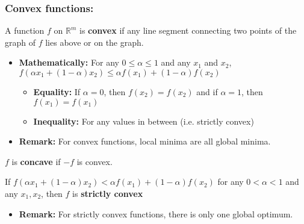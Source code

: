     \subsubsection{Convex functions:}
    \begin{definition}
        A function $f$ on $\mathbb{R}^m$ is \textbf{convex} if any line segment connecting two points of the graph of $f$ lies above or on the graph. 

            \begin{itemize}
                \item \textbf{Mathematically:} For any \( 0 \leq \alpha \leq 1 \) and any \( x_1 \) and \( x_2 \), $f(\alpha x_1 + (1-\alpha) x_2) \leq \alpha f(x_1) + (1-\alpha) f(x_2)$ 
                \begin{itemize}
                    \item \textbf{Equality:} If $\alpha = 0$, then $f(x_2) = f(x_2)$ and if $\alpha = 1$, then $f(x_1) = f(x_1)$
                    \item \textbf{Inequality:} For any values in between (i.e. strictly convex)
                \end{itemize}
                \item \textbf{Remark:} For convex functions, local minima are all global minima.
            \end{itemize}
    \end{definition}

    \begin{definition}
        $f$ is \textbf{concave} if $-f$ is convex. 
    \end{definition}

    \begin{definition}
        If $f(\alpha x_1 + (1-\alpha)x_2) < \alpha f(x_1) + (1-\alpha)f(x_2)$ for any \( 0 < \alpha < 1 \) and any \( x_1, x_2 \), then \( f \) is \textbf{strictly convex} 
        \begin{itemize}
            \item \textbf{Remark:} For strictly convex functions, there is only one global optimum.
        \end{itemize}
    \end{definition}

    \begin{example}
    \end{example}


